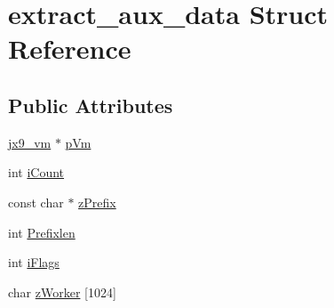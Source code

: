 \hypertarget{structextract__aux__data}{\section{extract\-\_\-aux\-\_\-data Struct Reference}
\label{d3/ded/structextract__aux__data}
}
\subsection*{Public Attributes}
\begin{DoxyCompactItemize}
\item 
\hyperlink{structjx9__vm}{jx9\-\_\-vm} $\ast$ \hyperlink{structextract__aux__data_aa9ee84344340b9cc43777b2cc71af0e7}{p\-Vm}
\item 
int \hyperlink{structextract__aux__data_ab7ddce464ac26f8035bfa709ebb35632}{i\-Count}
\item 
const char $\ast$ \hyperlink{structextract__aux__data_acbb0f144ff01a326cba2c317dc2c0bbe}{z\-Prefix}
\item 
int \hyperlink{structextract__aux__data_a77042b069c18d0696373068ef95b7151}{Prefixlen}
\item 
int \hyperlink{structextract__aux__data_afd9fb26ecbc9daa6169bf4d5fcd899eb}{i\-Flags}
\item 
char \hyperlink{structextract__aux__data_a24d99c3fdc86b1338e9ad8ea6540a34b}{z\-Worker} \mbox{[}1024\mbox{]}
\end{DoxyCompactItemize}


